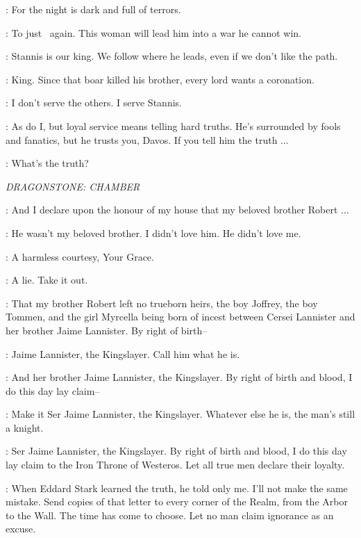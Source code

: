 \STANNIS: For the night is dark and full of terrors.

\CRESSEN: {To just \DAVOS ~again.} This woman will lead him into a war he cannot win.

\DAVOS: Stannis is our king. We follow where he leads, even if we don't like the path.

\CRESSEN: King. Since that boar killed his brother, every lord wants a coronation.

\DAVOS: I don't serve the others. I serve Stannis.

\CRESSEN: As do I, but loyal service means telling hard truths. He's surrounded by fools and fanatics, but he trusts you, Davos. If you tell him the truth $\ldots$

\DAVOS: What's the truth?


\scene

\textit{DRAGONSTONE: CHAMBER}


\MATTHOS: And I declare upon the honour of my house that my beloved brother Robert $\ldots$

\STANNIS: He wasn't my beloved brother. I didn't love him. He didn't love me.

\DAVOS: A harmless courtesy, Your Grace.

\STANNIS: A lie. Take it out.

\MATTHOS: That my brother Robert left no trueborn heirs, the boy Joffrey, the boy Tommen, and the girl Myrcella being born of incest between Cersei Lannister and her brother Jaime Lannister. By right of birth--

\STANNIS: Jaime Lannister, the Kingslayer. Call him what he is.

\MATTHOS: And her brother Jaime Lannister, the Kingslayer. By right of birth and blood, I do this day lay claim--

\STANNIS: Make it Ser Jaime Lannister, the Kingslayer. Whatever else he is, the man's still a knight.

\MATTHOS: Ser Jaime Lannister, the Kingslayer. By right of birth and blood, I do this day lay claim to the Iron Throne of Westeros. Let all true men declare their loyalty.

\STANNIS: When Eddard Stark learned the truth, he told only me. I'll not make the same mistake. Send copies of that letter to every corner of the Realm, from the Arbor to the Wall. The time has come to choose. Let no man claim ignorance as an excuse.

